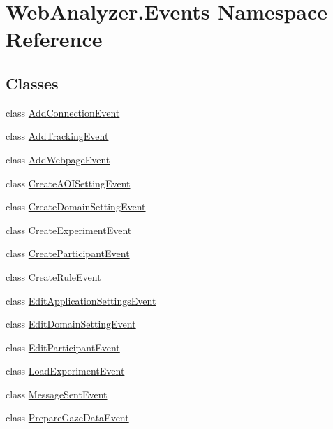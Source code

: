 \hypertarget{namespace_web_analyzer_1_1_events}{}\section{Web\+Analyzer.\+Events Namespace Reference}
\label{namespace_web_analyzer_1_1_events}
\subsection*{Classes}
\begin{DoxyCompactItemize}
\item 
class \hyperlink{class_web_analyzer_1_1_events_1_1_add_connection_event}{Add\+Connection\+Event}
\item 
class \hyperlink{class_web_analyzer_1_1_events_1_1_add_tracking_event}{Add\+Tracking\+Event}
\item 
class \hyperlink{class_web_analyzer_1_1_events_1_1_add_webpage_event}{Add\+Webpage\+Event}
\item 
class \hyperlink{class_web_analyzer_1_1_events_1_1_create_a_o_i_setting_event}{Create\+A\+O\+I\+Setting\+Event}
\item 
class \hyperlink{class_web_analyzer_1_1_events_1_1_create_domain_setting_event}{Create\+Domain\+Setting\+Event}
\item 
class \hyperlink{class_web_analyzer_1_1_events_1_1_create_experiment_event}{Create\+Experiment\+Event}
\item 
class \hyperlink{class_web_analyzer_1_1_events_1_1_create_participant_event}{Create\+Participant\+Event}
\item 
class \hyperlink{class_web_analyzer_1_1_events_1_1_create_rule_event}{Create\+Rule\+Event}
\item 
class \hyperlink{class_web_analyzer_1_1_events_1_1_edit_application_settings_event}{Edit\+Application\+Settings\+Event}
\item 
class \hyperlink{class_web_analyzer_1_1_events_1_1_edit_domain_setting_event}{Edit\+Domain\+Setting\+Event}
\item 
class \hyperlink{class_web_analyzer_1_1_events_1_1_edit_participant_event}{Edit\+Participant\+Event}
\item 
class \hyperlink{class_web_analyzer_1_1_events_1_1_load_experiment_event}{Load\+Experiment\+Event}
\item 
class \hyperlink{class_web_analyzer_1_1_events_1_1_message_sent_event}{Message\+Sent\+Event}
\item 
class \hyperlink{class_web_analyzer_1_1_events_1_1_prepare_gaze_data_event}{Prepare\+Gaze\+Data\+Event}

\end{DoxyCompactItemize}
